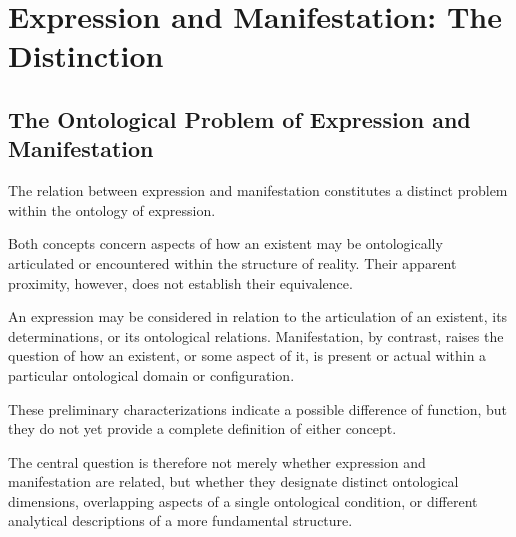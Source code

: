 %
%

\section{Expression and Manifestation: The Distinction}
\label{sec:expression-and-manifestation-distinction}

\subsection{The Ontological Problem of Expression and Manifestation}

The relation between expression and manifestation constitutes
a distinct problem within the ontology of expression.

Both concepts concern aspects of how an existent may be
ontologically articulated or encountered within the structure
of reality. Their apparent proximity, however, does not establish
their equivalence.

An expression may be considered in relation to the articulation
of an existent, its determinations, or its ontological relations.
Manifestation, by contrast, raises the question of how an existent,
or some aspect of it, is present or actual within a particular
ontological domain or configuration.

These preliminary characterizations indicate a possible
difference of function, but they do not yet provide a complete
definition of either concept.

The central question is therefore not merely whether expression
and manifestation are related, but whether they designate
distinct ontological dimensions, overlapping aspects of a single
ontological condition, or different analytical descriptions
of a more fundamental structure.

